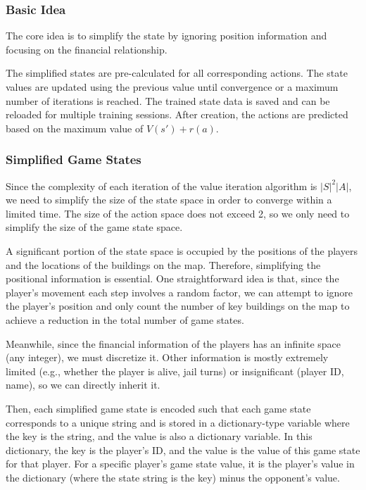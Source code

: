 \documentclass{article}
\begin{document}
\subsubsection{Basic Idea}
    The core idea is to simplify the state by ignoring position information and focusing on the financial relationship.
    
    The simplified states are pre-calculated for all corresponding actions. The state values are updated using the previous value until convergence or a maximum number of iterations is reached. The trained state data is saved and can be reloaded for multiple training sessions. After creation, the actions are predicted based on the maximum value of $V(s') + r(a)$.

\subsubsection{Simplified Game States}
    Since the complexity of each iteration of the value iteration algorithm is \( |S|^2|A| \), we need to simplify the size of the state space in order to converge within a limited time. The size of the action space does not exceed 2, so we only need to simplify the size of the game state space.
    
    A significant portion of the state space is occupied by the positions of the players and the locations of the buildings on the map. Therefore, simplifying the positional information is essential. One straightforward idea is that, since the player's movement each step involves a random factor, we can attempt to ignore the player's position and only count the number of key buildings on the map to achieve a reduction in the total number of game states.
    
    Meanwhile, since the financial information of the players has an infinite space (any integer), we must discretize it. Other information is mostly extremely limited (e.g., whether the player is alive, jail turns) or insignificant (player ID, name), so we can directly inherit it.
    
    Then, each simplified game state is encoded such that each game state corresponds to a unique string and is stored in a dictionary-type variable where the key is the string, and the value is also a dictionary variable. In this dictionary, the key is the player's ID, and the value is the value of this game state for that player. For a specific player's game state value, it is the player's value in the dictionary (where the state string is the key) minus the opponent's value.
    
\end{document}
